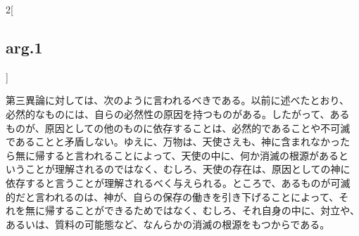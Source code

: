 \documentclass[paper=a4paper,fontsize=10pt,jafontsize=9pt,titlepage]{jlreq}
\begin{document}
\begin{paracol}{2}[\subsection{arg.1}]
\switchcolumn

第三異論に対しては、次のように言われるべきである。以前に述べたとおり、
必然的なものには、自らの必然性の原因を持つものがある。したがって、ある
ものが、原因としての他のものに依存することは、必然的であることや不可滅
であることと矛盾しない。ゆえに、万物は、天使さえも、神に含まれなかった
ら無に帰すると言われることによって、天使の中に、何か消滅の根源があると
いうことが理解されるのではなく、むしろ、天使の存在は、原因としての神に
依存すると言うことが理解されるべく与えられる。ところで、あるものが可滅
的だと言われるのは、神が、自らの保存の働きを引き下げることによって、そ
れを無に帰することができるためではなく、むしろ、それ自身の中に、対立や、
あるいは、質料の可能態など、なんらかの消滅の根源をもつからである。

\end{paracol}
\end{document}
